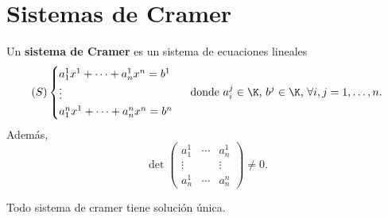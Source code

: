 \section{Sistemas de Cramer}

\begin{fdefinition}
\normalfont Un \textbf{sistema de Cramer} es un sistema de ecuaciones lineales
\[
\left(S\right) 
\begin{cases}
a^{1}_{1}x^{1} + \cdots + a^{1}_{n}x^{n} = b^{1} \\
\vdots \\
a^{n}_{1}x^{1}+\cdots + a^{n}_{n}x^{n} = b^{n}
\end{cases}
\text{ donde $\displaystyle a^{j}_{i} \in \K $, $\displaystyle b^{j} \in \K $, $\displaystyle \forall i, j = 1, \ldots, n $.}
\]
Además, 
\[\det \begin{pmatrix} a^{1}_{1} & \cdots & a^{1}_{n}\\
\vdots & & \vdots \\
a^{1}_{n} & \cdots & a^{n}_{n}\end{pmatrix} \neq 0 .\]
\end{fdefinition}

\begin{ftheorem}[]
\normalfont Todo sistema de cramer tiene solución única.
\end{ftheorem}


